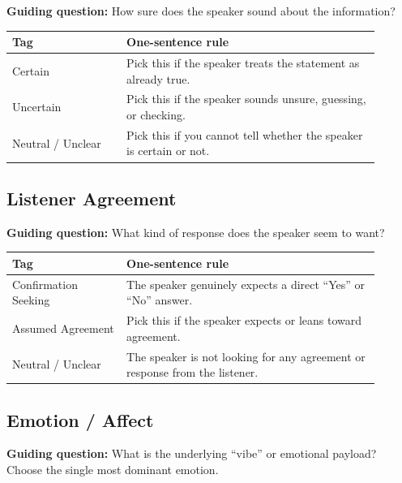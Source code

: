 \documentclass[11pt]{article}
\begin{document}
\noindent\textbf{Guiding question:} How sure does the speaker sound about the information?

\begin{table}[H]
\centering
\small
\begin{tabular}{p{0.28\linewidth}p{0.62\linewidth}}
\toprule
\textbf{Tag} & \textbf{One-sentence rule} \\
\midrule
Certain & Pick this if the speaker treats the statement as already true. \\
Uncertain & Pick this if the speaker sounds unsure, guessing, or checking. \\
Neutral / Unclear & Pick this if you cannot tell whether the speaker is certain or not. \\
\bottomrule
\end{tabular}
\end{table}
\vspace{-0.75em}

\subsection{Listener Agreement}

\noindent\textbf{Guiding question:} What kind of response does the speaker seem to want?

\begin{table}[H]
\centering
\small
\begin{tabular}{p{0.28\linewidth}p{0.62\linewidth}}
\toprule
\textbf{Tag} & \textbf{One-sentence rule} \\
\midrule
Confirmation Seeking & The speaker genuinely expects a direct ``Yes'' or ``No'' answer. \\
Assumed Agreement & Pick this if the speaker expects or leans toward agreement. \\
Neutral / Unclear & The speaker is not looking for any agreement or response from the listener. \\
\bottomrule
\end{tabular}
\end{table}
\vspace{-0.75em}

\subsection{Emotion / Affect}

\noindent\textbf{Guiding question:} What is the underlying ``vibe'' or emotional payload? Choose the single most dominant emotion.
\end{document}
